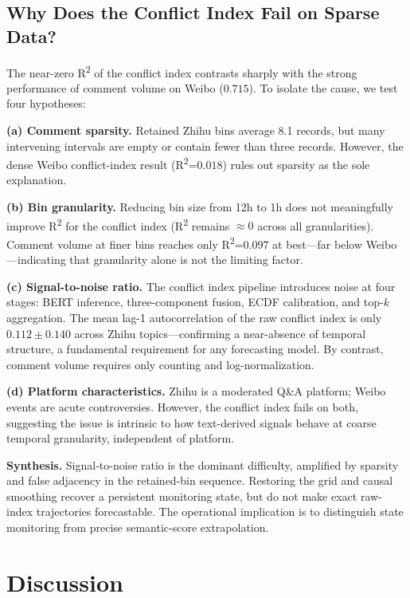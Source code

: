 \documentclass[11pt,a4paper]{article}
\begin{document}
\subsection{Why Does the Conflict Index Fail on Sparse Data?}

The near-zero R\textsuperscript{2} of the conflict index contrasts sharply with the strong performance of comment volume on Weibo ($0.715$). To isolate the cause, we test four hypotheses:

\textbf{(a) Comment sparsity.} Retained Zhihu bins average 8.1 records, but many intervening intervals are empty or contain fewer than three records. However, the dense Weibo conflict-index result (R\textsuperscript{2}=$0.018$) rules out sparsity as the sole explanation.

\textbf{(b) Bin granularity.} Reducing bin size from 12h to 1h does not meaningfully improve R\textsuperscript{2} for the conflict index (R\textsuperscript{2} remains $\approx 0$ across all granularities). Comment volume at finer bins reaches only R\textsuperscript{2}=$0.097$ at best---far below Weibo---indicating that granularity alone is not the limiting factor.

\textbf{(c) Signal-to-noise ratio.} The conflict index pipeline introduces noise at four stages: BERT inference, three-component fusion, ECDF calibration, and top-$k$ aggregation. The mean lag-1 autocorrelation of the raw conflict index is only $0.112 \pm 0.140$ across Zhihu topics---confirming a near-absence of temporal structure, a fundamental requirement for any forecasting model. By contrast, comment volume requires only counting and log-normalization.

\textbf{(d) Platform characteristics.} Zhihu is a moderated Q\&A platform; Weibo events are acute controversies. However, the conflict index fails on both, suggesting the issue is intrinsic to how text-derived signals behave at coarse temporal granularity, independent of platform.

\textbf{Synthesis.} Signal-to-noise ratio is the dominant difficulty, amplified by sparsity and false adjacency in the retained-bin sequence. Restoring the grid and causal smoothing recover a persistent monitoring state, but do not make exact raw-index trajectories forecastable. The operational implication is to distinguish state monitoring from precise semantic-score extrapolation.

\section{Discussion}
\end{document}
